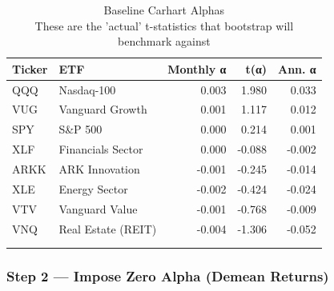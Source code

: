 \documentclass[
  letterpaper,
  DIV=11,
  numbers=noendperiod]{scrartcl}
\begin{document}
\begin{table}
\caption*{
{\fontsize{20}{25}\selectfont  Baseline Carhart Alphas\fontsize{12}{15}\selectfont } \\ 
{\fontsize{14}{17}\selectfont  These are the 'actual' t-statistics that bootstrap will benchmark against\fontsize{12}{15}\selectfont }
} 
\fontsize{12.0pt}{14.0pt}\selectfont
\begin{tabular*}{\linewidth}{@{\extracolsep{\fill}}llrrr}
\toprule
Ticker & ETF & Monthly α & t(α) & Ann. α \\ 
\midrule\addlinespace[2.5pt]
QQQ & Nasdaq-100 & 0.003 & 1.980 & 0.033 \\ 
VUG & Vanguard Growth & 0.001 & 1.117 & 0.012 \\ 
SPY & S\&P 500 & 0.000 & 0.214 & 0.001 \\ 
XLF & Financials Sector & 0.000 & -0.088 & -0.002 \\ 
ARKK & ARK Innovation & -0.001 & -0.245 & -0.014 \\ 
XLE & Energy Sector & -0.002 & -0.424 & -0.024 \\ 
VTV & Vanguard Value & -0.001 & -0.768 & -0.009 \\ 
VNQ & Real Estate (REIT) & -0.004 & -1.306 & -0.052 \\ 
{\cellcolor[HTML]{FFEBEE}{IWD}} & {\cellcolor[HTML]{FFEBEE}{Russell 1000 Value}} & {\cellcolor[HTML]{FFEBEE}{-0.002}} & {\cellcolor[HTML]{FFEBEE}{-2.327}} & {\cellcolor[HTML]{FFEBEE}{-0.025}} \\ 
{\cellcolor[HTML]{FFEBEE}{IWM}} & {\cellcolor[HTML]{FFEBEE}{Russell 2000}} & {\cellcolor[HTML]{FFEBEE}{-0.002}} & {\cellcolor[HTML]{FFEBEE}{-3.049}} & {\cellcolor[HTML]{FFEBEE}{-0.024}} \\ 
\bottomrule
\end{tabular*}
\end{table}

\subsubsection{Step 2 --- Impose Zero Alpha (Demean
Returns)}\label{step-2-impose-zero-alpha-demean-returns}
\end{document}
